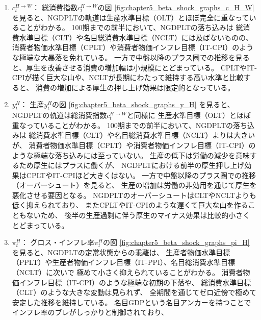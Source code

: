 \begin{enumerate}
    \item
    \label{itm:chapter5_beta_shock_policies_ngdplt_c_H_W}
        \(c_t^{H\to W}\)：
        総消費指数\(c_t^{H\to W}\)の図
        \ref{fig:chapter5_beta_shock_graphs_c_H_W}
        を見ると、NGDPLTの軌道は生産水準目標（OLT）とほぼ完全に重なっていることがわかる。
        100期までの前半において、NGDPLTの落ち込みは
        総消費水準目標（CLT）や名目総消費水準目標（NCLT）には及ばないものの、
        消費者物価水準目標（CPLT）や消費者物価インフレ目標（IT-CPI）のような極端な大暴落を免れている。
        一方で中盤以降のプラス圏での推移を見ると、厚生を改善させる消費の増加幅は小規模にとどまっている。
        CPLTやIT-CPIが描く巨大な山や、NCLTが長期にわたって維持する高い水準と比較すると、
        消費の増加による厚生の押し上げ効果は限定的となっている。
    \item
    \label{itm:chapter5_beta_shock_policies_ngdplt_y_H}
        \(y_t^H\)：
        生産\(y_t^H\)の図
        \ref{fig:chapter5_beta_shock_graphs_y_H}
        を見ると、NGDPLTの軌道は総消費指数\(c_t^{H\to W}\)と同様に
        生産水準目標（OLT）とほぼ重なっていることがわかる。
        100期までの前半において、NGDPLTの落ち込みは
        総消費水準目標（CLT）や名目総消費水準目標（NCLT）よりは大きいが、
        消費者物価水準目標（CPLT）や消費者物価インフレ目標（IT-CPI）のような極端な落ち込みには至っていない。
        生産の低下は労働の減少を意味するため厚生にはプラスに働くが、
        NGDPLTにおける前半の厚生押し上げ効果はCPLTやIT-CPIほど大きくはない。
        一方で中盤以降のプラス圏での推移（オーバーシュート）を見ると、
        生産の増加は労働の非効用を通じて厚生を悪化させる要因となる。
        NGDPLTのオーバーシュートはCLTやNCLTよりも低く抑えられており、
        またCPLTやIT-CPIのような遅くて巨大な山を作ることもないため、
        後半の生産過剰に伴う厚生のマイナス効果は比較的小さくとどまっている。
    \item
    \label{itm:chapter5_beta_shock_policies_ngdplt_pi_H}
        \(\pi_t^H\)：
        グロス・インフレ率\(\pi_t^H\)の図
        \ref{fig:chapter5_beta_shock_graphs_pi_H}
        を見ると、NGDPLTの定常状態からの乖離は、
        生産者物価水準目標（PPLT）や生産者物価インフレ目標（IT-PPI）、名目総消費水準目標（NCLT）に次いで
        極めて小さく抑えられていることがわかる。
        消費者物価インフレ目標（IT-CPI）のような極端な初期の下落や、
        総消費水準目標（CLT）のような大きな変動は見られず、
        全期間を通じてゼロ近傍で極めて安定した推移を維持している。
        名目GDPという名目アンカーを持つことでインフレ率のブレがしっかりと制御されており、

\end{enumerate}
